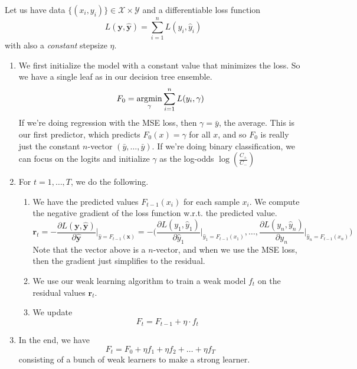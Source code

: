   \begin{definition}
    Let us have data $\{(x_i, y_i)\} \in \mathcal{X} \times \mathcal{Y}$ and a differentiable loss function 
    \begin{equation}
      L(\mathbf{y}, \hat{\mathbf{y}}) = \sum_{i=1}^n L(y_i, \hat{y}_i)
    \end{equation}
    with also a \textit{constant} stepsize $\eta$. 

    \begin{enumerate}
      \item We first initialize the model with a constant value that minimizes the loss. So we have a single leaf as in our decision tree ensemble. 
        \begin{equation}
          F_0 = \argmin_\gamma \sum_{i=1}^n L(y_i, \gamma)
        \end{equation}
        If we're doing regression with the MSE loss, then $\gamma = \bar{y}$, the average. This is our first predictor, which predicts $F_0 (x) = \gamma$ for all $x$, and so $F_0$ is really just the constant $n$-vector $(\bar{y}, \ldots, \bar{y})$. If we're doing binary classification, we can focus on the logits and initialize $\gamma$ as the log-odds $\log(\frac{C_+}{C_{-}})$

      \item For $t = 1, \ldots, T$, we do the following. 
        \begin{enumerate}
          \item We have the predicted values $F_{t-1}(x_i)$ for each sample $x_i$. We compute the negative gradient of the loss function w.r.t. the predicted value.
            \begin{equation}
              \mathbf{r}_t = - \frac{\partial L(\mathbf{y}, \hat{\mathbf{y}})}{\partial \hat{\mathbf{y}}} \bigg|_{\hat{y} = F_{t-1} (\mathbf{x})} = - \bigg( \frac{\partial L(y_1, \hat{y}_1)}{\partial \hat{y}_1} \bigg|_{\hat{y}_1 = F_{t-1} (x_1)}, \ldots, \frac{\partial L(y_n, \hat{y}_n)}{\partial y_n} \bigg|_{\hat{y}_n = F_{t-1}(x_n)} \bigg)
            \end{equation}
            Note that the vector above is a $n$-vector, and when we use the MSE loss, then the gradient just simplifies to the residual.  

          \item We use our weak learning algorithm to train a weak model $f_t$ on the residual values $\mathbf{r}_t$. 

          \item We update  
            \begin{equation}
              F_t = F_{t-1} + \eta \cdot f_t
            \end{equation}
        \end{enumerate}
      \item In the end, we have 
        \begin{equation}
          F_t = F_0 + \eta f_1 + \eta f_2 + \ldots + \eta f_T
        \end{equation}
        consisting of a bunch of weak learners to make a strong learner. 
    \end{enumerate}
  \end{definition}

